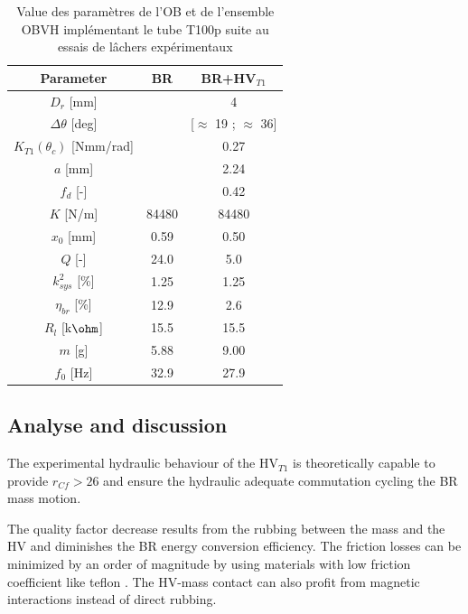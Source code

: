 \documentclass[3p,twocolumn,preprint]{elsarticle}
\begin{document}
\begin{table}[!htbp]
	\centering
		\begin{tabular}[t]{c|c|c}
\toprule
\multicolumn{1}{c}{\textbf{Parameter}}	&
\multicolumn{1}{c}{\textbf{BR}} 	& 
\multicolumn{1}{c}{\textbf{BR+HV$_{T1}$}}  \\
\midrule
$D_r$ [mm] 						& \cellcolor{ashgrey} 		& {4} 		\\ \hline
$\Delta\theta$ [deg] 			& \cellcolor{ashgrey} 		& {{[$\approx$ 19 ; $\approx$ 36]}} \\ \hline
$K_{T1}(\theta_c)$ [Nmm/rad]	& \cellcolor{ashgrey}  		&  0.27 		\\ \hline
$a$ [mm]         			    & \cellcolor{ashgrey}  		&  2.24		\\ \hline
$f_d$ [-] 						& \cellcolor{ashgrey}  		&  0.42  		\\ \hline
$K$ [N/m] 						&	84480			  	 	&  84480  			\\ \hline
$x_0$ [mm] 						& {0.59}					& {0.50}  	\\ \hline
$Q$	[-] 						& 		24.0		 		& 5.0     					\\ \hline
$k^2_{sys}$ [\%] 				& 		1.25		 		& {1.25}   	\\ \hline
$\eta_{br}$ [\%] 				& 		12.9		 		& 2.6   \\ \hline	
$R_l$ [k$\text{\ohm}$] 			&	{15.5}					& {15.5}   	\\ \hline		
$m$	[g]						    &	{5.88}					& 9.00   		\\ \hline	
$f_0$ [Hz]						&		32.9				& 27.9   					\\
\bottomrule	
	\end{tabular}
        \caption{Value des paramètres de l'OB et de l'ensemble OBVH implémentant le tube T100p suite au essais de lâchers expérimentaux}
        \label{tab:parametres lacher tube}
\end{table}        
	\subsection{Analyse and discussion}
The experimental hydraulic behaviour of the HV$_{T1}$ is theoretically capable to provide \mbox{$r_{Cf}>26$} and ensure the hydraulic adequate commutation cycling the BR mass motion.

The quality factor decrease results from the rubbing between the mass and the HV and diminishes the BR energy conversion efficiency. The friction losses can be minimized by an order of magnitude by using materials with low friction coefficient like teflon \cite{Nosonovsky2013}. The HV-mass contact can also profit from magnetic interactions instead of direct rubbing.
\end{document}
